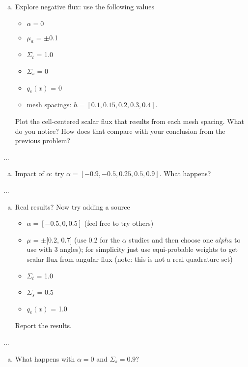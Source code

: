 \documentclass[10pt]{article}
\begin{document}
\begin{enumerate}[(a)]
\item Explore negative flux: use the following values
\begin{itemize}
\setlength\itemsep{0em}
\item $\alpha = 0$
\item $\mu_a$ = $\pm$0.1
\item $\Sigma_t$ = 1.0
\item $\Sigma_s$ = 0
\item $q_e(x)$ = 0
\item mesh spacings: $h = [0.1, 0.15, 0.2, 0.3, 0.4]$.
\end{itemize}
Plot the cell-centered scalar flux that results from each mesh spacing. What do you notice? How does that compare with your conclusion from the previous problem? 
\end{enumerate}

...



\begin{enumerate}[(b)]
\item Impact of $\alpha$: try $\alpha = [-0.9, -0.5, 0.25, 0.5, 0.9]$. What happens?
\end{enumerate}

...



\begin{enumerate}[(c)]
\item Real results? Now try adding a source
\begin{itemize}
\setlength\itemsep{0em}
\item $\alpha = [-0.5, 0, 0.5]$ (feel free to try others)
\item $\mu$ = $\pm$[0.2, 0.7] (use 0.2 for the $\alpha$ studies and then choose one $alpha$ to use with 3 angles); for simplicity just use equi-probable weights to get scalar flux from angular flux (note: this is not a real quadrature set)
\item $\Sigma_t$ = 1.0
\item $\Sigma_s$ = 0.5
\item $q_e(x)$ = 1.0
\end{itemize}
Report the results. 
\end{enumerate}

...



\begin{enumerate}[(d)]
\item What happens with $\alpha = 0$ and $\Sigma_s = 0.9$?
\end{enumerate}
\end{document}
